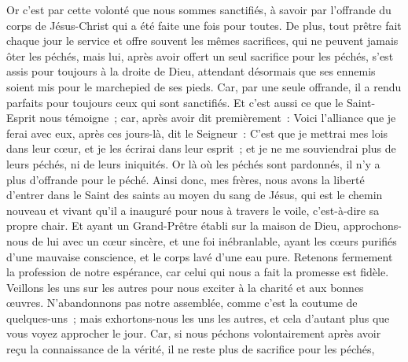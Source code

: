 \begin{multicols}{2}
Or c'est par cette volonté que nous sommes sanctifiés, à savoir par l'offrande du corps de Jésus-Christ qui a été faite une fois pour toutes.
De plus, tout prêtre fait chaque jour le service et offre souvent les mêmes sacrifices, qui ne peuvent jamais ôter les péchés,
mais lui, après avoir offert un seul sacrifice pour les péchés, s'est assis pour toujours à la droite de Dieu,
attendant désormais que ses ennemis soient mis pour le marchepied de ses pieds.
Car, par une seule offrande, il a rendu parfaits pour toujours ceux qui sont sanctifiés.
Et c'est aussi ce que le Saint-Esprit nous témoigne~; car, après avoir dit premièrement~:
Voici l'alliance que je ferai avec eux, après ces jours-là, dit le Seigneur~: C'est que je mettrai mes lois dans leur cœur, et je les écrirai dans leur esprit~;
et je ne me souviendrai plus de leurs péchés, ni de leurs iniquités.
Or là où les péchés sont pardonnés, il n'y a plus d'offrande pour le péché.
Ainsi donc, mes frères, nous avons la liberté d'entrer dans le Saint des saints au moyen du sang de Jésus,
qui est le chemin nouveau et vivant qu'il a inauguré pour nous à travers le voile, c'est-à-dire sa propre chair.
Et ayant un Grand-Prêtre établi sur la maison de Dieu,
approchons-nous de lui avec un cœur sincère, et une foi inébranlable, ayant les cœurs purifiés d'une mauvaise conscience, et le corps lavé d'une eau pure.
Retenons fermement la profession de notre espérance, car celui qui nous a fait la promesse est fidèle.
Veillons les uns sur les autres pour nous exciter à la charité et aux bonnes œuvres.
N'abandonnons pas notre assemblée, comme c'est la coutume de quelques-uns~; mais exhortons-nous les uns les autres, et cela d'autant plus que vous voyez approcher le jour.
Car, si nous péchons volontairement après avoir reçu la connaissance de la vérité, il ne reste plus de sacrifice pour les péchés,

\end{multicols}
